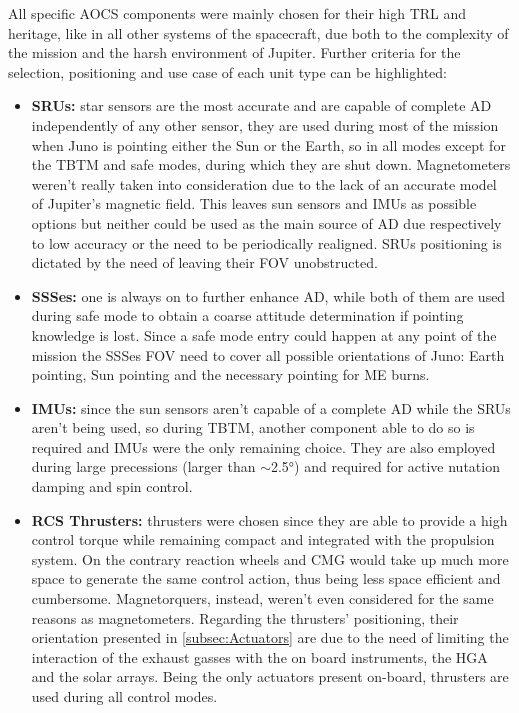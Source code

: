 All specific AOCS components were mainly chosen for their high TRL and heritage, like in all other systems of the spacecraft, due both to the complexity of the mission and the harsh environment of Jupiter. Further criteria for the selection, positioning and use case of each unit type can be highlighted:
\begin{itemize}
    \item \textbf{SRUs:} star sensors are the most accurate and are capable of complete AD independently of any other sensor, they are used during most of the mission when Juno is pointing either the Sun or the Earth, so in all modes except for the TBTM and safe modes, during which they are shut down. Magnetometers weren't really taken into consideration due to the lack of an accurate model of Jupiter's magnetic field. This leaves sun sensors and IMUs as possible options but neither could be used as the main source of AD due respectively to low accuracy or the need to be periodically realigned. SRUs positioning is dictated by the need of leaving their FOV unobstructed.
    \item \textbf{SSSes:} one is always on to further enhance AD, while both of them are used during safe mode to obtain a coarse attitude determination if pointing knowledge is lost. Since a safe mode entry could happen at any point of the mission the SSSes FOV need to cover all possible orientations of Juno: Earth pointing, Sun pointing and the necessary pointing for ME burns.
    \item \textbf{IMUs:} since the sun sensors aren't capable of a complete AD while the SRUs aren't being used, so during TBTM, another component able to do so is required and IMUs were the only remaining choice. They are also employed during large precessions (larger than $\sim$2.5°) and required for active nutation damping and spin control. \cite{juno_sito}
    \item \textbf{RCS Thrusters:} thrusters were chosen since they are able to provide a high control torque while remaining compact and integrated with the propulsion system. On the contrary reaction wheels and CMG would take up much more space to generate the same control action, thus being less space efficient and cumbersome. Magnetorquers, instead, weren't even considered for the same reasons as magnetometers. Regarding the thrusters' positioning, their orientation presented in \autoref{subsec:Actuators} are due to the need of limiting the interaction of the exhaust gasses with the on board instruments, the HGA and the solar arrays. Being the only actuators present on-board, thrusters are used during all control modes.     
\end{itemize}  
 